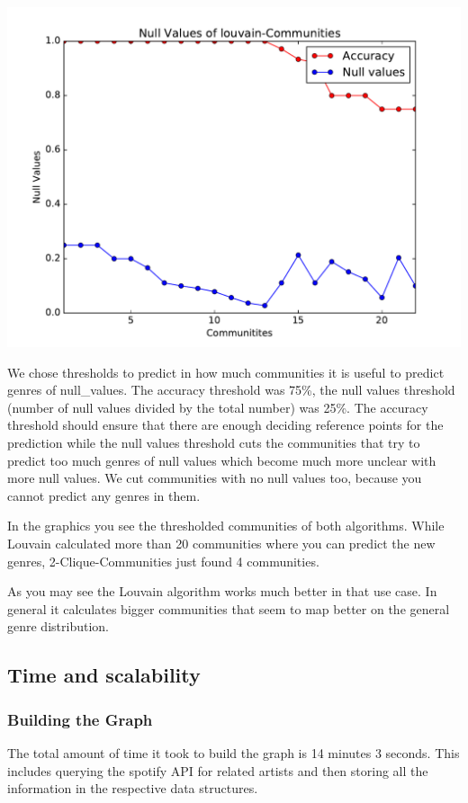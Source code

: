 \documentclass[11pt,a4paper,onecolumn,notitlepage]{article}
\begin{document}
\includegraphics[scale=0.4]{spotify_null_louvain.pdf}

We chose thresholds to predict in how much communities it is useful to predict genres of null_values. The accuracy threshold was 75\%, the null values threshold (number of null values divided by the total number) was 25\%. The accuracy threshold should ensure that there are enough deciding reference points for the prediction while the null values threshold cuts the communities that try to predict too much genres of null values which become much more unclear with more null values. We cut communities with no null values too, because you cannot predict any genres in them.

In the graphics you see the thresholded communities of both algorithms. While Louvain calculated more than 20 communities where you can predict the new genres, 2-Clique-Communities just found 4 communities.

As you may see the Louvain algorithm works much better in that use case. In general it calculates bigger communities that seem to map better on the general genre distribution. 


\subsection{Time and scalability}

\subsubsection*{Building the Graph}

The total amount of time it took to build the graph is 14 minutes 3 seconds. This includes querying the spotify API for related artists and then storing all the information in the respective data structures.
\end{document}
